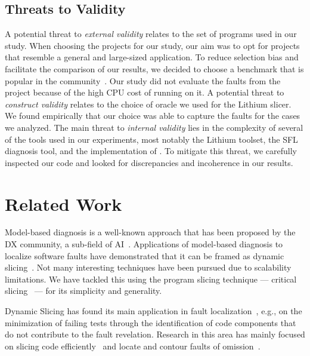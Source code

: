 \documentclass{article}
\begin{document}
\subsection{Threats to Validity}
%
A potential threat to \textit{external validity} relates to the set of programs used in
our study. When choosing the projects for our study, our aim was to opt for
projects that resemble a general and large-sized application. To reduce
selection bias and facilitate the comparison of our results, we decided to
choose a benchmark that is popular in the community~\cite{just-defects4j-issta2014}.
Our study did not evaluate the faults from the \closure{}
project because of the high CPU cost of running  on it. A potential
threat to \textit{construct validity} relates to the choice of oracle
we used for the Lithium slicer. We found empirically that our choice was able to capture 
the faults for the cases we analyzed.
The main threat to \textit{internal validity} lies in the complexity of several of the tools
used in our experiments, most notably the Lithium toolset, the SFL diagnosis tool,
and the implementation of \comb{}. To mitigate this threat, we
carefully inspected our code and looked for discrepancies and
incoherence in our results.

%
\section{Related Work}

Model-based diagnosis is a well-known approach that has been proposed by the DX
community, a sub-field of
AI~\cite{REITER198757,wotawa2002relationship,DEKLEER200325}. Applications of
model-based diagnosis to localize software faults have demonstrated that it can
be framed as dynamic
slicing~\cite{Mayer:2008:EMM:1642931.1642950,mayer2008prioritising,nica2013use}.
Not many interesting techniques have been pursued due to scalability
limitations. We have tackled this using the program slicing technique ---
critical slicing~\cite{DeMillo:1996:CSS:229000.226310} --- for its simplicity
and generality.

Dynamic Slicing has found its main application in fault
localization~\cite{Agrawal:1990:DPS:93542.93576}, e.g.,  on the minimization of
failing tests through the identification of code components that do not
contribute to the fault revelation. Research in this area has mainly focused on
slicing code
efficiently~\cite{Wang:2008:DSJ:1330017.1330021,Wang:2004:UCB:998675.999455} and
locate and contour faults of
omission~\cite{Zhang:2007:TLE:1250734.1250782,Lin:2018:BDE:3238147.3238163}.
\end{document}
